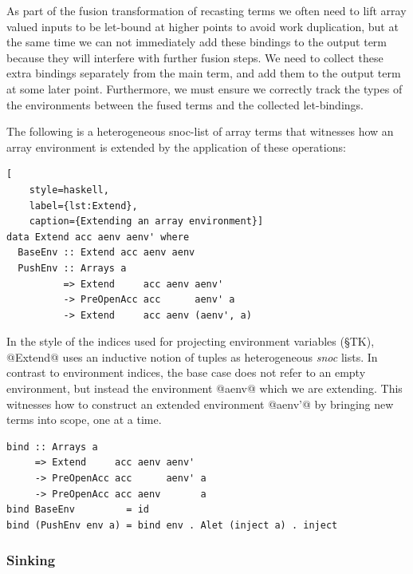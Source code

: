 As part of the fusion transformation of recasting terms we often need to lift
array valued inputs to be let-bound at higher points to avoid work duplication,
but at the same time we can not immediately add these bindings to the output
term because they will interfere with further fusion steps. We need to collect
these extra bindings separately from the main term, and add them to the output
term at some later point. Furthermore, we must ensure we correctly track the
types of the environments between the fused terms and the collected
let-bindings.

The following is a heterogeneous snoc-list of array terms that witnesses how an
array environment is extended by the application of these operations:
%
\begin{lstlisting}[
    style=haskell,
    label={lst:Extend},
    caption={Extending an array environment}]
data Extend acc aenv aenv' where
  BaseEnv :: Extend acc aenv aenv
  PushEnv :: Arrays a
          => Extend     acc aenv aenv'
          -> PreOpenAcc acc      aenv' a
          -> Extend     acc aenv (aenv', a)
\end{lstlisting}
%
In the style of the  indices used for projecting environment
variables (\S TK), @Extend@ uses an inductive notion of tuples as
heterogeneous \emph{snoc} lists. In contrast to environment indices, the base
case does not refer to an empty environment, but instead the environment
@aenv@ which we are extending. This witnesses how to construct an extended
environment @aenv'@ by bringing new terms into scope, one at a time.
%
\begin{lstlisting}[style=haskell]
bind :: Arrays a
     => Extend     acc aenv aenv'
     -> PreOpenAcc acc      aenv' a
     -> PreOpenAcc acc aenv       a
bind BaseEnv         = id
bind (PushEnv env a) = bind env . Alet (inject a) . inject
\end{lstlisting}


\subsubsection{Sinking}
\label{sec:sinking}

